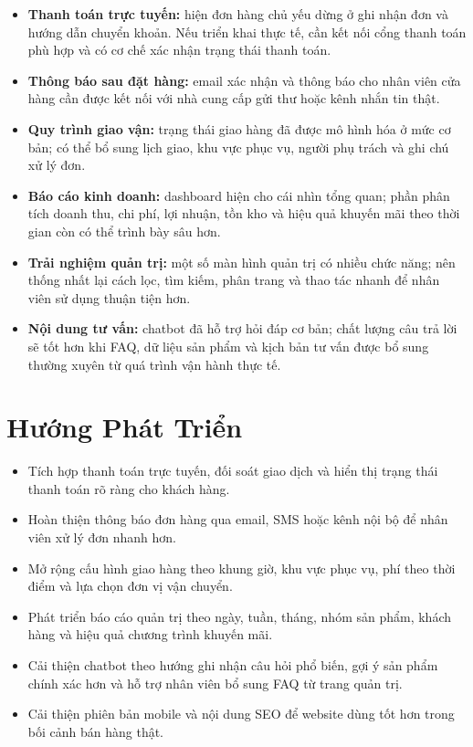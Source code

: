 \begin{itemize}[leftmargin=2em, itemsep=5pt]
  \item \textbf{Thanh toán trực tuyến:} hiện đơn hàng chủ yếu dừng ở ghi nhận đơn và hướng dẫn chuyển khoản. Nếu triển khai thực tế, cần kết nối cổng thanh toán phù hợp và có cơ chế xác nhận trạng thái thanh toán.
  \item \textbf{Thông báo sau đặt hàng:} email xác nhận và thông báo cho nhân viên cửa hàng cần được kết nối với nhà cung cấp gửi thư hoặc kênh nhắn tin thật.
  \item \textbf{Quy trình giao vận:} trạng thái giao hàng đã được mô hình hóa ở mức cơ bản; có thể bổ sung lịch giao, khu vực phục vụ, người phụ trách và ghi chú xử lý đơn.
  \item \textbf{Báo cáo kinh doanh:} dashboard hiện cho cái nhìn tổng quan; phần phân tích doanh thu, chi phí, lợi nhuận, tồn kho và hiệu quả khuyến mãi theo thời gian còn có thể trình bày sâu hơn.
  \item \textbf{Trải nghiệm quản trị:} một số màn hình quản trị có nhiều chức năng; nên thống nhất lại cách lọc, tìm kiếm, phân trang và thao tác nhanh để nhân viên sử dụng thuận tiện hơn.
  \item \textbf{Nội dung tư vấn:} chatbot đã hỗ trợ hỏi đáp cơ bản; chất lượng câu trả lời sẽ tốt hơn khi FAQ, dữ liệu sản phẩm và kịch bản tư vấn được bổ sung thường xuyên từ quá trình vận hành thực tế.
\end{itemize}

\section{Hướng Phát Triển}

\begin{itemize}[leftmargin=2em, itemsep=5pt]
  \item Tích hợp thanh toán trực tuyến, đối soát giao dịch và hiển thị trạng thái thanh toán rõ ràng cho khách hàng.
  \item Hoàn thiện thông báo đơn hàng qua email, SMS hoặc kênh nội bộ để nhân viên xử lý đơn nhanh hơn.
  \item Mở rộng cấu hình giao hàng theo khung giờ, khu vực phục vụ, phí theo thời điểm và lựa chọn đơn vị vận chuyển.
  \item Phát triển báo cáo quản trị theo ngày, tuần, tháng, nhóm sản phẩm, khách hàng và hiệu quả chương trình khuyến mãi.
  \item Cải thiện chatbot theo hướng ghi nhận câu hỏi phổ biến, gợi ý sản phẩm chính xác hơn và hỗ trợ nhân viên bổ sung FAQ từ trang quản trị.
  \item Cải thiện phiên bản mobile và nội dung SEO để website dùng tốt hơn trong bối cảnh bán hàng thật.
\end{itemize}

